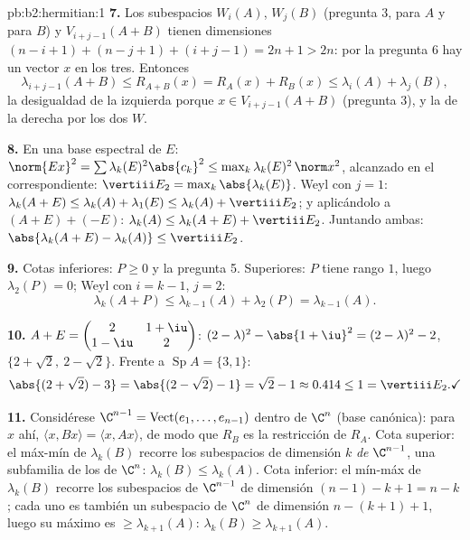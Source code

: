 \begin{solution}{pb:b2:hermitian:1}
\textbf{7.} Los subespacios $W_i(A)$, $W_j(B)$ (pregunta 3, para $A$
y para $B$) y $V_{i+j-1}(A+B)$ tienen dimensiones $(n-i+1) + (n-j+1)
+ (i+j-1) = 2n + 1 > 2n$: por la pregunta 6 hay un vector 
$x$ en los tres. Entonces
\[
\lambda_{i+j-1}(A+B) \leq R_{A+B}(x)
= R_A(x) + R_B(x) \leq \lambda_i(A) + \lambda_j(B),
\]
la desigualdad de la izquierda porque $x \in V_{i+j-1}(A+B)$
(pregunta 3), y la de la derecha por los dos $W$.

\textbf{8.} En una base espectral de $E$: $\norm{Ex}^2 = \sum
\lambda_k(E)^2\abs{c_k}^2 \leq \max_k\lambda_k(E)^2\,\norm x^2$,
alcanzado en el  correspondiente: $\vertiii E_2 =
\max_k\abs{\lambda_k(E)}$. Weyl con $j = 1$: $\lambda_k(A+E) \leq
\lambda_k(A) + \lambda_1(E) \leq \lambda_k(A) + \vertiii E_2$; y
aplicándolo a $(A+E) + (-E)$: $\lambda_k(A) \leq \lambda_k(A+E) +
\vertiii E_2$. Juntando ambas: $\abs{\lambda_k(A+E) - \lambda_k(A)}
\leq \vertiii E_2$.

\textbf{9.} Cotas inferiores: $P \geq 0$ y la pregunta 5. Superiores:
$P$ tiene rango $1$, luego $\lambda_2(P) = 0$; Weyl con $i = k-1$, $j
= 2$:
\[
\lambda_k(A + P) \leq \lambda_{k-1}(A) + \lambda_2(P)
= \lambda_{k-1}(A) .
\]

\textbf{10.} $A + E = \begin{pmatrix} 2 & 1+\iu\\ 1-\iu &
2\end{pmatrix}$:  $(2-\lambda)^2 -
\abs{1+\iu}^2 = (2-\lambda)^2 - 2$,  $\{2 + \sqrt2,\ 2 -
\sqrt2\}$. Frente a $\operatorname{Sp}A = \{3, 1\}$:
\[
\abs{(2+\sqrt2) - 3} = \abs{(2-\sqrt2) - 1} = \sqrt2 - 1
\approx 0.414 \leq 1 = \vertiii E_2 . \checkmark
\]

\textbf{11.} Considérese $\C^{n-1} = \operatorname{Vect}(e_1, \dots,
e_{n-1})$ dentro de $\C^n$ (base canónica): para $x$ ahí, $\langle x,
Bx\rangle = \langle x, Ax\rangle$, de modo que $R_B$ es la
restricción de $R_A$. Cota superior: el máx-mín de $\lambda_k(B)$
recorre los subespacios de dimensión $k$ \emph{de} $\C^{n-1}$, una
subfamilia de los de $\C^n$: $\lambda_k(B) \leq \lambda_k(A)$. Cota
inferior: el mín-máx de $\lambda_k(B)$ recorre los subespacios de
$\C^{n-1}$ de dimensión $(n-1)-k+1 = n-k$; cada uno es también un
subespacio de $\C^n$ de dimensión $n - (k+1) + 1$, luego su máximo es
$\geq \lambda_{k+1}(A)$: $\lambda_k(B) \geq \lambda_{k+1}(A)$.


\end{solution}
